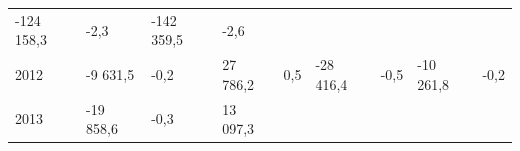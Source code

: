 \begin{longtable}[]{@{}lllllllll@{}}
\begin{minipage}[t]{0.12\columnwidth}
-124 158,3\strut
\end{minipage} & \begin{minipage}[t]{0.06\columnwidth}\raggedright
-2,3\strut
\end{minipage} & \begin{minipage}[t]{0.09\columnwidth}\raggedright
-142 359,5\strut
\end{minipage} & \begin{minipage}[t]{0.06\columnwidth}\raggedright
-2,6\strut
\end{minipage}\tabularnewline
\begin{minipage}[t]{0.05\columnwidth}\raggedright
2012\strut
\end{minipage} & \begin{minipage}[t]{0.10\columnwidth}\raggedright
-9 631,5\strut
\end{minipage} & \begin{minipage}[t]{0.06\columnwidth}\raggedright
-0,2\strut
\end{minipage} & \begin{minipage}[t]{0.16\columnwidth}\raggedright
27 786,2\strut
\end{minipage} & \begin{minipage}[t]{0.06\columnwidth}\raggedright
0,5\strut
\end{minipage} & \begin{minipage}[t]{0.12\columnwidth}\raggedright
-28 416,4\strut
\end{minipage} & \begin{minipage}[t]{0.06\columnwidth}\raggedright
-0,5\strut
\end{minipage} & \begin{minipage}[t]{0.09\columnwidth}\raggedright
-10 261,8\strut
\end{minipage} & \begin{minipage}[t]{0.06\columnwidth}\raggedright
-0,2\strut
\end{minipage}\tabularnewline
\begin{minipage}[t]{0.05\columnwidth}\raggedright
2013\strut
\end{minipage} & \begin{minipage}[t]{0.10\columnwidth}\raggedright
-19 858,6\strut
\end{minipage} & \begin{minipage}[t]{0.06\columnwidth}\raggedright
-0,3\strut
\end{minipage} & \begin{minipage}[t]{0.16\columnwidth}\raggedright
13 097,3\strut

\end{minipage}
\end{longtable}
